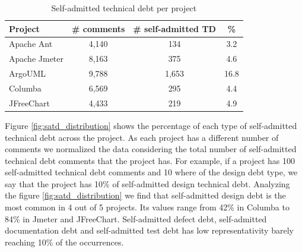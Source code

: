 \begin{table}[!hbt]
     \begin{center}
           \caption{Self-admitted technical debt per project}
           \label{tab:total_self_admitted_per_project}
           \begin{tabular}{l| c c c }
           \toprule
           \textbf{Project}      & \textbf{\# comments}     & \textbf{\# self-admitted TD} & \textbf{\%} \\ \midrule 
             Apache Ant          & 4,140                          & 134                                & 3.2  \\                                   
             Apache Jmeter       & 8,163                          & 375                                & 4.6  \\                                   
             ArgoUML             & 9,788                          & 1,653                              & 16.8 \\                                   
             Columba             & 6,569                          & 295                                & 4.4 \\                                   
             JFreeChart          & 4,433                          & 219                                & 4.9  \\ \bottomrule
           \end{tabular}
     \end{center}
\end{table}

Figure \ref{fig:satd_distribution} shows the percentage of each type of self-admitted technical debt across the project. As each project has a different number of comments we normalized the data considering the total number of self-admitted technical debt comments that the project has. For example, if a project has 100 self-admitted technical debt comments and 10 where of the design debt type, we say that the project has 10\% of self-admitted design technical debt. Analyzing the figure \ref{fig:satd_distribution} we find that self-admitted design debt is the most common in 4 out of 5 projects. Its values range from 42\% in Columba to 84\% in Jmeter and JFreeChart. Self-admitted defect debt, self-admitted documentation debt and self-admitted test debt has low representativity barely reaching 10\% of the occurrences. 



